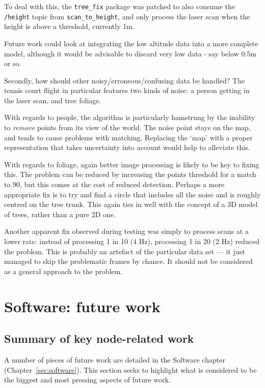 \documentclass[12pt,oneside,a4paper,draft]{book}
\begin{document}
To deal with this, the \texttt{tree\_fix} package was patched to also
consume the \texttt{/height} topic from \texttt{scan\_to\_height}, and
only process the laser scan when the height is above a threshold,
currently 1m.

Future work could look at integrating the low altitude data into a
more complete model, although it would be advisable to discard very
low data - say below 0.5m or so.

Secondly, how should other noisy/erroneous/confusing data be handled? The tennis court
flight in particular features two kinds of noise: a person getting in
the laser scan, and tree foliage.

With regards to people, the algorithm is particularly hamstrung by the
inability to \emph{remove} points from its view of the world. The
noise point stays on the map, and tends to cause problems with
matching. Replacing the `map' with a proper representation that takes
uncertainty into account would help to alleviate this.

With regards to foliage, again better image processing is likely to
be key to fixing this. The problem can be reduced by increasing the
points threshold for a match to 90, but this comes at the cost of
reduced detection. Perhaps a more appropriate fix is to try and find a
circle that includes all the noise and is roughly centred on the tree
trunk. This again ties in well with the concept of a 3D model of trees,
rather than a pure 2D one.

Another apparent fix observed during testing was simply to process
scans at a lower rate: instead of processing 1 in 10 (4 Hz),
processing 1 in 20 (2 Hz) reduced the problem. This is probably an
artefact of the particular data set --- it just managed to skip the
problematic frames by chance. It should not be considered as a
general approach to the problem.

\section{Software: future work}
\label{sec:softw-future-work}

\subsection{Summary of key node-related work}
\label{sec:summary-key-node}

A number of pieces of future work are detailed in the Software
chapter (Chapter~\ref{sec:software}). This section seeks to highlight
what is considered to be the biggest and most pressing aspects of
future work.
\end{document}

